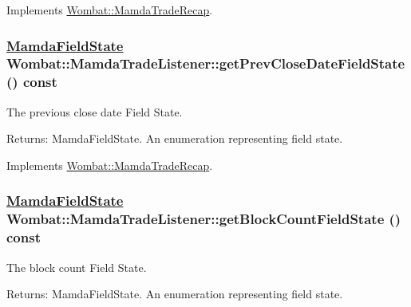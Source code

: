 Implements \hyperlink{classWombat_1_1MamdaTradeRecap_c19498f35c75d790cbfa74fc249824eb}{Wombat::Mamda\-Trade\-Recap}.\hypertarget{classWombat_1_1MamdaTradeListener_280ff9e5c40998c03f12a789fe90613f}{
\subsubsection[getPrevCloseDateFieldState]{\setlength{\rightskip}{0pt plus 5cm}\hyperlink{namespaceWombat_93aac974f2ab713554fd12a1fa3b7d2a}{Mamda\-Field\-State} Wombat::Mamda\-Trade\-Listener::get\-Prev\-Close\-Date\-Field\-State () const}}
\label{classWombat_1_1MamdaTradeListener_280ff9e5c40998c03f12a789fe90613f}


The previous close date Field State. 

\begin{Desc}
\item[Returns:]Mamda\-Field\-State. An enumeration representing field state. \end{Desc}


Implements \hyperlink{classWombat_1_1MamdaTradeRecap_33ca111d0e9e5b1bbe9e5c3ccd3d4c8c}{Wombat::Mamda\-Trade\-Recap}.\hypertarget{classWombat_1_1MamdaTradeListener_0fd74766b284afb545bd976dc7c84060}{
\subsubsection[getBlockCountFieldState]{\setlength{\rightskip}{0pt plus 5cm}\hyperlink{namespaceWombat_93aac974f2ab713554fd12a1fa3b7d2a}{Mamda\-Field\-State} Wombat::Mamda\-Trade\-Listener::get\-Block\-Count\-Field\-State () const}}
\label{classWombat_1_1MamdaTradeListener_0fd74766b284afb545bd976dc7c84060}


The block count Field State. 

\begin{Desc}
\item[Returns:]Mamda\-Field\-State. An enumeration representing field state. \end{Desc}


